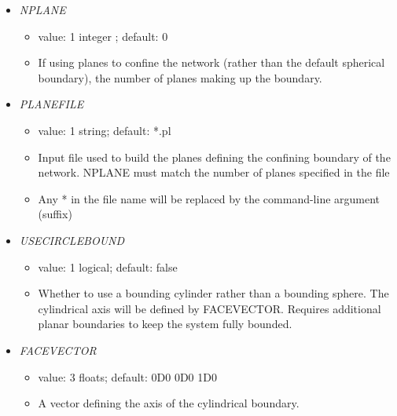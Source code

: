 \documentclass[12pt]{article}
\begin{document}
\begin{itemize}
    \begin{itemize}
      \item  value: 1 to 2 floats; defaults: -1D0, 1D4
      \item CELLRAD1, ECONF (confinement radius, energy prefactor)
      \item Confine the network inside a sphere of radius CELLRAD1. The confinement energy is quadratic with prefactor ECONF. These two parameters may alternatively be specified on their own lines
\end{itemize}
%
\item {\it NPLANE}
  \begin{itemize}
    \item  value: 1 integer ; default: $0$
    \item If using planes to confine the network (rather than the default spherical boundary), the number of planes making up the boundary.
  \end{itemize}
%
\item {\it PLANEFILE}
  \begin{itemize}
    \item  value: 1 string; default: *.pl
    \item Input file used to build the planes defining the confining boundary of the network. NPLANE must match the number of planes specified in the file
    \item Any * in the file name will be replaced by the command-line argument (suffix)
  \end{itemize}

\item {\it USECIRCLEBOUND}
  \begin{itemize}
    \item value: 1 logical; default: false
    \item Whether to use a bounding cylinder rather than a bounding sphere. The cylindrical axis will be defined by FACEVECTOR. Requires additional planar boundaries to keep the system fully bounded.
  \end{itemize}

\item {\it FACEVECTOR}
  \begin{itemize}
    \item value: 3 floats; default: 0D0 0D0 1D0
    \item A vector defining the axis of the cylindrical boundary.
  \end{itemize}

\end{itemize}
\end{document}
